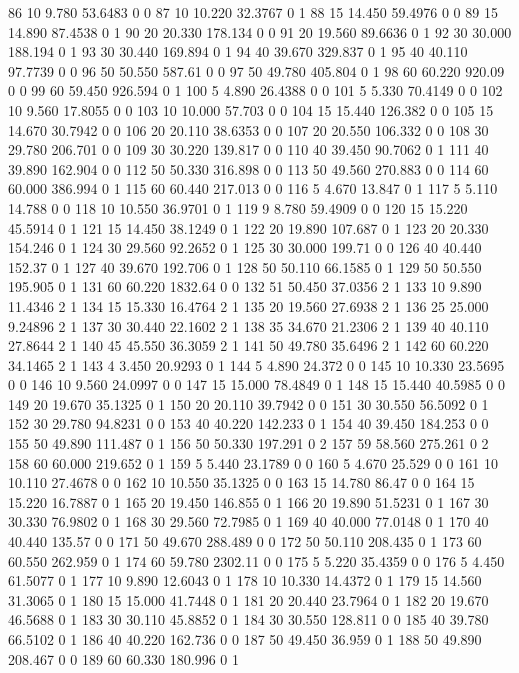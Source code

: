 {86 10 9.780 53.6483 0 0
87 10 10.220 32.3767 0 1
88 15 14.450 59.4976 0 0
89 15 14.890 87.4538 0 1
90 20 20.330 178.134 0 0
91 20 19.560 89.6636 0 1
92 30 30.000 188.194 0 1
93 30 30.440 169.894 0 1
94 40 39.670 329.837 0 1
95 40 40.110 97.7739 0 0
96 50 50.550 587.61 0 0
97 50 49.780 405.804 0 1
98 60 60.220 920.09 0 0
99 60 59.450 926.594 0 1
100 5 4.890 26.4388 0 0
101 5 5.330 70.4149 0 0
102 10 9.560 17.8055 0 0
103 10 10.000 57.703 0 0
104 15 15.440 126.382 0 0
105 15 14.670 30.7942 0 0
106 20 20.110 38.6353 0 0
107 20 20.550 106.332 0 0
108 30 29.780 206.701 0 0
109 30 30.220 139.817 0 0
110 40 39.450 90.7062 0 1
111 40 39.890 162.904 0 0
112 50 50.330 316.898 0 0
113 50 49.560 270.883 0 0
114 60 60.000 386.994 0 1
115 60 60.440 217.013 0 0
116 5 4.670 13.847 0 1
117 5 5.110 14.788 0 0
118 10 10.550 36.9701 0 1
119 9 8.780 59.4909 0 0
120 15 15.220 45.5914 0 1
121 15 14.450 38.1249 0 1
122 20 19.890 107.687 0 1
123 20 20.330 154.246 0 1
124 30 29.560 92.2652 0 1
125 30 30.000 199.71 0 0
126 40 40.440 152.37 0 1
127 40 39.670 192.706 0 1
128 50 50.110 66.1585 0 1
129 50 50.550 195.905 0 1
131 60 60.220 1832.64 0 0
132 51 50.450 37.0356 2 1
133 10 9.890 11.4346 2 1
134 15 15.330 16.4764 2 1
135 20 19.560 27.6938 2 1
136 25 25.000 9.24896 2 1
137 30 30.440 22.1602 2 1
138 35 34.670 21.2306 2 1
139 40 40.110 27.8644 2 1
140 45 45.550 36.3059 2 1
141 50 49.780 35.6496 2 1
142 60 60.220 34.1465 2 1
143 4 3.450 20.9293 0 1
144 5 4.890 24.372 0 0
145 10 10.330 23.5695 0 0
146 10 9.560 24.0997 0 0
147 15 15.000 78.4849 0 1
148 15 15.440 40.5985 0 0
149 20 19.670 35.1325 0 1
150 20 20.110 39.7942 0 0
151 30 30.550 56.5092 0 1
152 30 29.780 94.8231 0 0
153 40 40.220 142.233 0 1
154 40 39.450 184.253 0 0
155 50 49.890 111.487 0 1
156 50 50.330 197.291 0 2
157 59 58.560 275.261 0 2
158 60 60.000 219.652 0 1
159 5 5.440 23.1789 0 0
160 5 4.670 25.529 0 0
161 10 10.110 27.4678 0 0
162 10 10.550 35.1325 0 0
163 15 14.780 86.47 0 0
164 15 15.220 16.7887 0 1
165 20 19.450 146.855 0 1
166 20 19.890 51.5231 0 1
167 30 30.330 76.9802 0 1
168 30 29.560 72.7985 0 1
169 40 40.000 77.0148 0 1
170 40 40.440 135.57 0 0
171 50 49.670 288.489 0 0
172 50 50.110 208.435 0 1
173 60 60.550 262.959 0 1
174 60 59.780 2302.11 0 0
175 5 5.220 35.4359 0 0
176 5 4.450 61.5077 0 1
177 10 9.890 12.6043 0 1
178 10 10.330 14.4372 0 1
179 15 14.560 31.3065 0 1
180 15 15.000 41.7448 0 1
181 20 20.440 23.7964 0 1
182 20 19.670 46.5688 0 1
183 30 30.110 45.8852 0 1
184 30 30.550 128.811 0 0
185 40 39.780 66.5102 0 1
186 40 40.220 162.736 0 0
187 50 49.450 36.959 0 1
188 50 49.890 208.467 0 0
189 60 60.330 180.996 0 1
}
